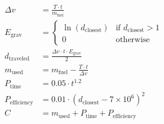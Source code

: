 \begin{align*}
\Delta v &= \frac{T \cdot t}{m_{\text{fuel}}} \\
E_{\text{grav}} &= 
\begin{cases} 
\ln(d_{\text{closest}}) & \text{if } d_{\text{closest}} > 1 \\
0 & \text{otherwise}
\end{cases} \\
d_{\text{traveled}} &= \frac{\Delta v \cdot t \cdot E_{\text{grav}}}{2} \\
m_{\text{used}} &= m_{\text{fuel}} - \frac{T \cdot t}{\Delta v} \\
P_{\text{time}} &= 0.05 \cdot t^{1.2} \\
P_{\text{efficiency}} &= 0.01 \cdot (d_{\text{closest}} - 7 \times 10^6)^2 \\
C &= m_{\text{used}} + P_{\text{time}} + P_{\text{efficiency}}
\end{align*}